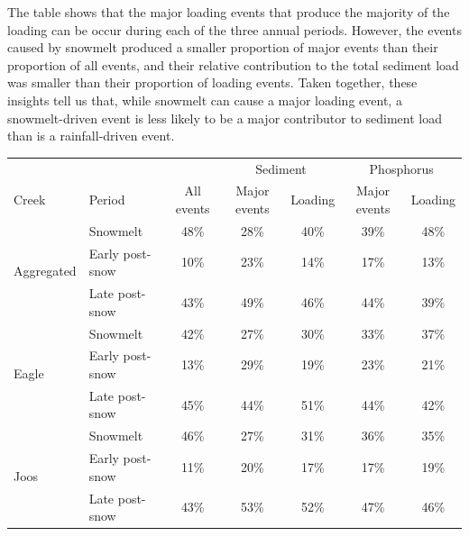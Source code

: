 \documentclass[12pt]{article}
\begin{document}
The table shows that the major loading events that produce the majority of the loading can be occur during each of the three annual periods. However, the events caused by snowmelt produced a smaller proportion of major events than their proportion of all events, and their relative contribution to the total sediment load was smaller than their proportion of loading events. Taken together, these insights tell us that, while snowmelt can cause a major loading event, a snowmelt-driven event is less likely to be a major contributor to sediment load than is a rainfall-driven event.\\



\begin{table}[h]
    \begin{center}
    \begin{tabular}{llccccc}
        &  &  & \multicolumn{2}{c}{Sediment} & \multicolumn{2}{c}{Phosphorus} \\
        Creek & Period & All events & Major events & Loading & Major events & Loading \\
        \hline 
        \multirow{3}{*}{Aggregated} & Snowmelt & 
        48\% &
        28\% & 
        40\% & 
        39\% & 
        48\% \\
        & Early post-snow & 
        10\% &
        23\% & 
        14\% & 
        17\% & 
        13\% \\
        & Late post-snow & 
        43\% &
        49\% & 
        46\% & 
        44\% & 
        39\% \\
        
        \hline 
        \multirow{3}{*}{Eagle} & Snowmelt & 
        42\% &
        27\% & 
        30\% & 
        33\% & 
        37\% \\
        & Early post-snow & 
        13\% &
        29\% & 
        19\% & 
        23\% & 
        21\% \\
        & Late post-snow & 
        45\% &
        44\% & 
        51\% & 
        44\% & 
        42\% \\
        
        \hline 
        \multirow{3}{*}{Joos} & Snowmelt & 
        46\% &
        27\% & 
        31\% & 
        36\% & 
        35\% \\
        & Early post-snow & 
        11\% &
        20\% & 
        17\% & 
        17\% & 
        19\% \\
        & Late post-snow & 
        43\% &
        53\% & 
        52\% & 
        47\% & 
        46\% \\
        

\end{tabular}
\end{center}
\end{table}
\end{document}
